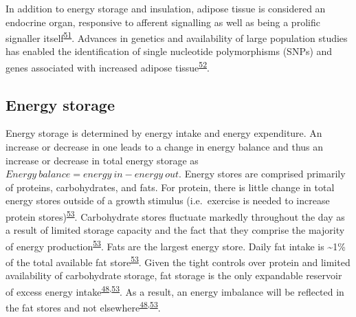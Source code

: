 \documentclass[11pt,twoside]{bristolthesis}
\begin{document}
In addition to energy storage and insulation, adipose tissue is considered an endocrine organ, responsive to afferent signalling as well as being a prolific signaller itself\textsuperscript{\protect\hyperlink{ref-Kershaw2004}{51}}. Advances in genetics and availability of large population studies has enabled the identification of single nucleotide polymorphisms (SNPs) and genes associated with increased adipose tissue\textsuperscript{\protect\hyperlink{ref-Dahlman2010}{52}}.

\hypertarget{energy-storage}{%
\subsection{Energy storage}\label{energy-storage}}

Energy storage is determined by energy intake and energy expenditure. An increase or decrease in one leads to a change in energy balance and thus an increase or decrease in total energy storage as \(Energy\ balance = energy\ in - energy\ out\). Energy stores are comprised primarily of proteins, carbohydrates, and fats. For protein, there is little change in total energy stores outside of a growth stimulus (i.e.~exercise is needed to increase protein stores)\textsuperscript{\protect\hyperlink{ref-Galgani2008}{53}}. Carbohydrate stores fluctuate markedly throughout the day as a result of limited storage capacity and the fact that they comprise the majority of energy production\textsuperscript{\protect\hyperlink{ref-Galgani2008}{53}}. Fats are the largest energy store. Daily fat intake is \textasciitilde{}1\% of the total available fat store\textsuperscript{\protect\hyperlink{ref-Galgani2008}{53}}. Given the tight controls over protein and limited availability of carbohydrate storage, fat storage is the only expandable reservoir of excess energy intake\textsuperscript{\protect\hyperlink{ref-Frayn2003}{48},\protect\hyperlink{ref-Galgani2008}{53}}. As a result, an energy imbalance will be reflected in the fat stores and not elsewhere\textsuperscript{\protect\hyperlink{ref-Frayn2003}{48},\protect\hyperlink{ref-Galgani2008}{53}}.
\end{document}

